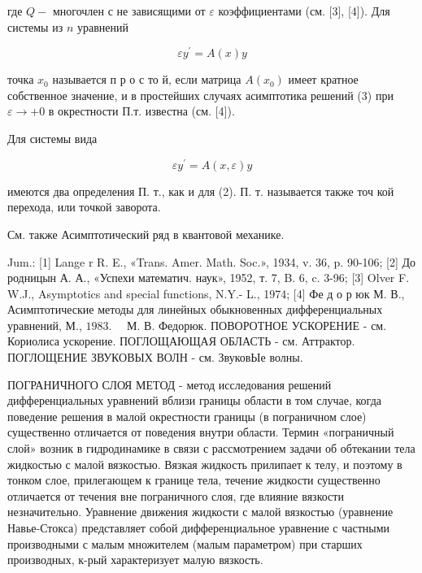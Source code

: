 \documentclass[10pt]{article}
\begin{document}
где $Q-$ многочлен с не зависящими от $\varepsilon$ коэффициентами (см. [3], [4]). Для системы из $n$ уравнений



\[

\varepsilon y^{\prime}=A(x) y

\]



точка $x_{0}$ называется п р о с то й, если матрица $A\left(x_{0}\right)$ имеет кратное собственное значение, и в простейших случаях асимптотика решений (3) при $\varepsilon \rightarrow+0$ в окрестности П.т. известна (см. [4]).



Для системы вида



\[

\varepsilon y^{\prime}=A(x, \varepsilon) y

\]



имеются два определения П. т., как и для (2). П. т. называется также точ кой перехода, или точкой заворота.



См. также Асимптотический ряд в квантовой механике.



Jum.: [1] Lange r R. E., «Trans. Amer. Math. Soc.», 1934, v. 36, p. 90-106; [2] До родницын А. А., «Успехи математич. наук», 1952, т. 7, B. 6, c. 3-96; [3] Olver F. W.J., Asymptotics and special functions, N.Y.- L., 1974; [4] Фе д о р юк М. В., Асимптотические методы для линейных обыкновенных дифференциальных уравнений, М., $1983 . \quad$ М. В. Федорюк. ПОВОРОТНОЕ УСКОРЕНИЕ - см. Кориолиса ускорение. ПОГЛОЩАЮЩАЯ ОБЛАСТЬ - см. Аттрактор. ПОГЛОЩЕНИЕ ЗВУКОВЫХ ВОЛН - см. ЗвуковЫе волны.



ПОГРАНИЧНОГО СЛОЯ МЕТОД - метод исследования решений дифференциальных уравнений вблизи границы области в том случае, когда поведение решения в малой окрестности границы (в пограничном слое) существенно отличается от поведения внутри области. Термин «пограничный слой» возник в гидродинамике в связи с рассмотрением задачи об обтекании тела жидкостью с малой вязкостью. Вязкая жидкость прилипает к телу, и поэтому в тонком слое, прилегающем к границе тела, течение жидкости существенно отличается от течения вне пограничного слоя, где влияние вязкости незначительно. Уравнение движения жидкости с малой вязкостью (уравнение Навье-Стокса) представляет собой дифференциальное уравнение с частными производными с малым множителем (малым параметром) при старших производных, к-рый характеризует малую вязкость.
\end{document}
